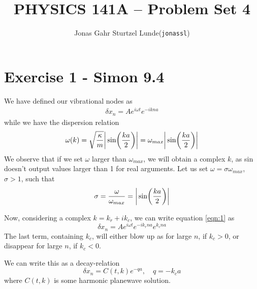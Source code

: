 \documentclass[12p,a4paper]{article}
\renewcommand{\exp}{e^}
\renewcommand{\exp}{e^}
\begin{document}
\title{PHYSICS 141A -- Problem Set 4}
\author{
    \begin{tabular}{r l}
        Jonas Gahr Sturtzel Lunde & (\texttt{jonassl})
    \end{tabular}}

\maketitle

\hspace{10cm}

\section*{Exercise 1 - Simon 9.4}
We have defined our vibrational nodes as
\begin{align}\label{eqn:1}
    \delta x_n = A\exp{i\omega t}\exp{-ikna}
\end{align}
while we have the dispersion relation
\[
    \omega(k) = \sqrt{\frac{\kappa}{m}} \qty|\, \sin(\frac{ka}{2})| = \omega_{max} \qty|\, \sin(\frac{ka}{2})|
\]
We observe that if we set $\omega$ larger than $\omega_{max}$, we will obtain a complex $k$, as sin doesn't output values larger than 1 for real arguments. Let us set $\omega = \sigma\omega_{max}$, $\sigma > 1$, such that
\begin{align}\label{eqn:2}
    \sigma = \frac{\omega}{\omega_{max}} = \qty|\, \sin(\frac{ka}{2})|
\end{align}

Now, considering a complex $k = k_r + i k_c$, we can write equation \ref{eqn:1} as
\[
    \delta x_n = A\exp{i\omega t} \exp{-ik_rna}\exp{k_cna}
\]
The last term, containing $k_c$, will either blow up as for large $n$, if $k_c > 0$, or disappear for large $n$, if $k_c < 0$. 

We can write this as a decay-relation
\[
    \delta x_n = C(t, k) \exp{-qa}, \quad q = -k_ca
\]
where $C(t, k)$ is some harmonic planewave solution.
\end{document}
